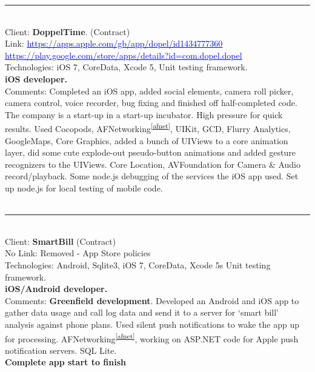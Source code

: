 \documentclass{article}
\begin{document}
\noindent\hfil\rule{0.5\textwidth}{.4pt}\hfil
\\

Client: 	\textbf  {DoppelTime}.  (Contract) \\
Link: \textcolor{blue}{ \underline{https://apps.apple.com/gb/app/dopel/id1434777360}} \\
\textcolor{blue}{ \underline{ https://play.google.com/store/apps/details?id=com.dopel.dopel   }}  \\
Technologies: 	iOS 7, CoreData, Xcode 5, Unit testing framework. \\
\textbf{ 		iOS developer. } \\
Comments:	Completed an iOS app, added social elements, camera roll picker, camera control, voice recorder, bug fixing and finished off half-completed code. The company is a start-up in a start-up incubator. High pressure for quick results.  Used Cocopods, AFNetworking\textsuperscript{\ref{afnet}}, UIKit, GCD, Flurry Analytics, GoogleMaps, Core Graphics, added a bunch of UIViews to a core animation layer, did some cute explode-out pseudo-button animations and added gesture recognizers to the UIViews.  Core Location, AVFoundation for Camera \& Audio record/playback. Some node.js debugging of the services the iOS app used. Set up node.js for local testing of mobile code. \\
\\

\noindent\hfil\rule{0.5\textwidth}{.4pt}\hfil
\\

Client: 	\textbf  {SmartBill} (Contract) \\
No Link: Removed - App Store policies \\
Technologies: 	Android, Sqlite3, iOS 7, CoreData, Xcode 5s Unit testing framework.  \\
\textbf{ iOS/Android developer.  }\\
Comments:	\textbf { Greenfield development}. Developed an Android and iOS app to gather data usage and call log data and send it to a server for ‘smart bill’ analysis against phone plans. Used silent push notifications to wake the app up for processing. AFNetworking\textsuperscript{\ref{afnet}}, working on ASP.NET code for Apple push notification servers. SQL Lite. \\
\textbf{Complete app start to finish} \\
\\
\end{document}
